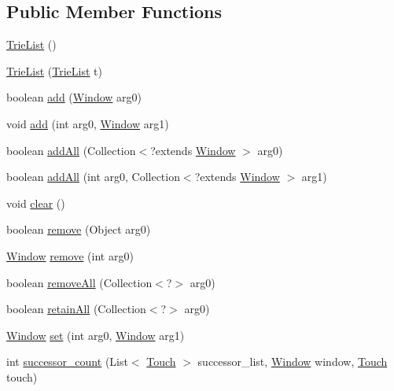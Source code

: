 \subsection*{Public Member Functions}
\begin{DoxyCompactItemize}
\item 
\hyperlink{classtrie_1_1_trie_list_a080afd57ffa7220ba51a4f8e8f16c7b4}{Trie\+List} ()
\item 
\hyperlink{classtrie_1_1_trie_list_a4edc08953617846d3d13050951a319e5}{Trie\+List} (\hyperlink{classtrie_1_1_trie_list}{Trie\+List} t)
\item 
boolean \hyperlink{classtrie_1_1_trie_list_a4b3c20b9e91337a4bbf3604fe2c66b3b}{add} (\hyperlink{classcomponents_1_1_window}{Window} arg0)
\item 
void \hyperlink{classtrie_1_1_trie_list_a857adbaf3b3c81d7bacf6b8258920a0c}{add} (int arg0, \hyperlink{classcomponents_1_1_window}{Window} arg1)
\item 
boolean \hyperlink{classtrie_1_1_trie_list_a51ba821144816982deb88f4c25ab4966}{add\+All} (Collection$<$?extends \hyperlink{classcomponents_1_1_window}{Window} $>$ arg0)
\item 
boolean \hyperlink{classtrie_1_1_trie_list_a522999ec5023a861fa914af49bcde0d2}{add\+All} (int arg0, Collection$<$?extends \hyperlink{classcomponents_1_1_window}{Window} $>$ arg1)
\item 
void \hyperlink{classtrie_1_1_trie_list_a6bfa2ade95d246ea95a3071993f1600f}{clear} ()
\item 
boolean \hyperlink{classtrie_1_1_trie_list_a5b290c36befb18333f000caf4c0080e1}{remove} (Object arg0)
\item 
\hyperlink{classcomponents_1_1_window}{Window} \hyperlink{classtrie_1_1_trie_list_ac4e6c299679bd53f8f38f87dac12bdb0}{remove} (int arg0)
\item 
boolean \hyperlink{classtrie_1_1_trie_list_ae0298e14b450853968bc61a88fb41dfe}{remove\+All} (Collection$<$?$>$ arg0)
\item 
boolean \hyperlink{classtrie_1_1_trie_list_a49157c8085a17723c493b3cf1fe112e6}{retain\+All} (Collection$<$?$>$ arg0)
\item 
\hyperlink{classcomponents_1_1_window}{Window} \hyperlink{classtrie_1_1_trie_list_aa23a0325d6d9ccd4fda580073cf40954}{set} (int arg0, \hyperlink{classcomponents_1_1_window}{Window} arg1)
\item 
int \hyperlink{classtrie_1_1_trie_list_a42644a837b91c05c2db9a106bd02e30d}{successor\+\_\+count} (List$<$ \hyperlink{classcomponents_1_1_touch}{Touch} $>$ successor\+\_\+list, \hyperlink{classcomponents_1_1_window}{Window} window, \hyperlink{classcomponents_1_1_touch}{Touch} touch)

\end{DoxyCompactItemize}
